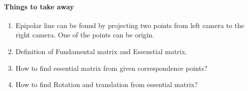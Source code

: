 \documentclass[times,singlecolumn]{article}
\begin{document}
\paragraph{Things to take away}
\begin{enumerate}
  \item Epipolar line can be found by projecting two points from left camera to
    the right camera. One of the points can be origin.
  \item Definition of Fundamental matrix and Essenstial matrix.
  \item How to find essential matrix from given correspondence points?
  \item How to find Rotation and translation from essential matrix?
\end{enumerate}
\end{document}

